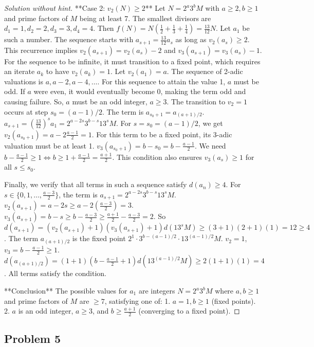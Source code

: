 \begin{proof} [Solution without hint]
**Case 2: $v_2(N) \ge 2$**
Let $N = 2^a 3^b M$ with $a \ge 2, b \ge 1$ and prime factors of $M$ being at least 7. The smallest divisors are $d_1=1, d_2=2, d_3=3, d_4=4$.
Then $f(N) = N\left(\frac{1}{2}+\frac{1}{3}+\frac{1}{4}\right) = \frac{13}{12}N$.
Let $a_1$ be such a number. The sequence starts with $a_{s+1} = \frac{13}{12}a_s$ as long as $v_2(a_s) \ge 2$.
This recurrence implies $v_2(a_{s+1})=v_2(a_s)-2$ and $v_3(a_{s+1})=v_3(a_s)-1$. For the sequence to be infinite, it must transition to a fixed point, which requires an iterate $a_k$ to have $v_2(a_k)=1$.
Let $v_2(a_1)=a$. The sequence of 2-adic valuations is $a, a-2, a-4, \dots$. For this sequence to attain the value 1, $a$ must be odd. If $a$ were even, it would eventually become 0, making the term odd and causing failure. So, $a$ must be an odd integer, $a \ge 3$.
The transition to $v_2=1$ occurs at step $s_0 = (a-1)/2$. The term is $a_{s_0+1} = a_{(a+1)/2}$.
$a_{s+1} = \left(\frac{13}{12}\right)^s a_1 = 2^{a-2s} 3^{b-s} 13^s M$.
For $s=s_0=(a-1)/2$, we get $v_2(a_{s_0+1}) = a-2\frac{a-1}{2}=1$.
For this term to be a fixed point, its 3-adic valuation must be at least 1.
$v_3(a_{s_0+1}) = b-s_0 = b-\frac{a-1}{2}$. We need $b-\frac{a-1}{2} \ge 1 \iff b \ge 1+\frac{a-1}{2} = \frac{a+1}{2}$.
This condition also ensures $v_3(a_s) \ge 1$ for all $s \le s_0$.

Finally, we verify that all terms in such a sequence satisfy $d(a_n) \ge 4$.
For $s \in \{0, 1, \dots, \frac{a-3}{2}\}$, the term is $a_{s+1} = 2^{a-2s} 3^{b-s} 13^s M$.
$v_2(a_{s+1}) = a-2s \ge a-2(\frac{a-3}{2}) = 3$.
$v_3(a_{s+1}) = b-s \ge b-\frac{a-3}{2} \ge \frac{a+1}{2}-\frac{a-3}{2} = 2$.
So $d(a_{s+1}) = (v_2(a_{s+1})+1)(v_3(a_{s+1})+1)d(13^s M) \ge (3+1)(2+1)(1) = 12 \ge 4$.
The term $a_{(a+1)/2}$ is the fixed point $2^1 \cdot 3^{b-(a-1)/2} \cdot 13^{(a-1)/2} M$.
$v_2=1$, $v_3 = b-\frac{a-1}{2} \ge 1$.
$d(a_{(a+1)/2}) = (1+1)(b-\frac{a-1}{2}+1)d(13^{(a-1)/2}M) \ge 2(1+1)(1) = 4$.
All terms satisfy the condition.

**Conclusion**
The possible values for $a_1$ are integers $N=2^a 3^b M$ where $a,b \ge 1$ and prime factors of $M$ are $\ge 7$, satisfying one of:
1.  $a=1, b \ge 1$ (fixed points).
2.  $a$ is an odd integer, $a \ge 3$, and $b \ge \frac{a+1}{2}$ (converging to a fixed point).
\end{proof}

\subsection{Problem 5}

